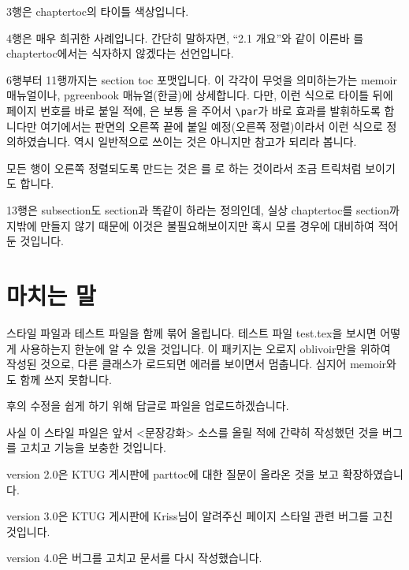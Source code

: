 \documentclass[chapter,a4paper,oneside,colorlinks]{oblivoir}
\renewcommand*\cftsectionafterpnum{\hfill}
\renewcommand*\cftsectionfont{\hfill}
\begin{document}
3행은 chaptertoc의 타이틀 색상입니다.

4행은 매우 희귀한 사례입니다. 간단히 말하자면, ``2.1 개요''와 같이 이른바 를 
chaptertoc에서는 식자하지 않겠다는 선언입니다. 

6행부터 11행까지는 section toc 포맷입니다. 이 각각이 무엇을 의미하는가는 memoir 매뉴얼이나, 
pgreenbook 매뉴얼(한글)에 상세합니다.
다만, 이런 식으로 타이틀 뒤에 페이지 번호를 바로 붙일 적에, \cmd{\cftsectionafterpnum}은 보통 \cmd{\cftparfillskip}을 주어서 \verb|\par|가 바로 효과를 발휘하도록 합니다만 여기에서는 판면의 오른쪽 끝에 붙일 예정(오른쪽 정렬)이라서 이런 식으로 정의하였습니다. 역시 일반적으로 쓰이는 것은 아니지만 참고가 되리라 봅니다.

모든 행이 오른쪽 정렬되도록 만드는 것은 \cmd{\cftsectionfont}를 \cmd{\hfill}로 하는 것이라서
조금 트릭처럼 보이기도 합니다.

13행은 subsection도 section과 똑같이 하라는 정의인데, 실상 chaptertoc를 section까지밖에
만들지 않기 때문에 이것은 불필요해보이지만 혹시 모를 경우에 대비하여 적어둔 것입니다.

\section{마치는 말}

스타일 파일과 테스트 파일을 함께 묶어 올립니다. 테스트 파일 test.tex을 보시면 어떻게 사용하는지 한눈에 알 수 있을 것입니다. 이 패키지는 오로지 oblivoir만을 위하여 작성된 것으로, 다른 클래스가 로드되면 에러를 보이면서 멈춥니다. 심지어 memoir와도 함께 쓰지 못합니다.

후의 수정을 쉽게 하기 위해 답글로 파일을 업로드하겠습니다.

사실 이 스타일 파일은 앞서 <문장강화> 소스를 올릴 적에 간략히 작성했던 것을 버그를 고치고 기능을 보충한 것입니다.

version 2.0은 KTUG 게시판에 parttoc에 대한 질문이 올라온 것을 보고 확장하였습니다.

version 3.0은 KTUG 게시판에 Kriss님이 알려주신 페이지 스타일 관련 버그를 고친 것입니다.

version 4.0은 버그를 고치고 문서를 다시 작성했습니다.
\end{document}
